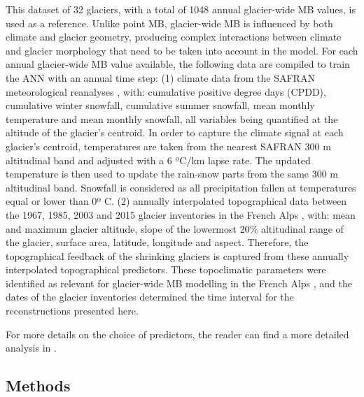 {This dataset of 32 glaciers, with a total of 1048 annual glacier-wide MB values, is used as a reference. Unlike point MB, glacier-wide MB is influenced by both climate and glacier geometry, producing complex interactions between climate and glacier morphology that  need to be taken into account in the model. For each annual glacier-wide MB value available, the following data are compiled to train the ANN with an annual time step: (1) climate data from the SAFRAN meteorological reanalyses \citep{durand_reanalysis_2009}, with: cumulative positive degree days (CPDD), cumulative winter snowfall, cumulative summer snowfall, mean monthly temperature and mean monthly snowfall, all variables being quantified at the altitude of the glacier's centroid. In order to capture the climate signal at each glacier's centroid, temperatures are taken from the nearest SAFRAN 300 m altitudinal band and adjusted with a 6 ºC/km lapse rate. The updated temperature is then used to update the rain-snow parts from the same 300 m altitudinal band. Snowfall is considered as all precipitation fallen at temperatures equal or lower than 0º C. (2) annually interpolated topographical data between the 1967, 1985, 2003 and 2015 glacier inventories in the French Alps \citep[update of][]{gardent_multitemporal_2014}, with: mean and maximum glacier altitude, slope of the lowermost 20\% altitudinal range of the glacier, surface area, latitude, longitude and aspect. Therefore, the topographical feedback of the shrinking glaciers is captured from these annually interpolated topographical predictors. These topoclimatic parameters were identified as relevant for glacier-wide MB modelling in the French Alps \citep{bolibar_deep_2020-1}, and the dates of the glacier inventories determined the time interval for the reconstructions presented here.

For more details on the choice of predictors, the reader can find a more detailed analysis in \citet{bolibar_deep_2020-1}.

\subsection{Methods} \label{past:methods:methods}

}
